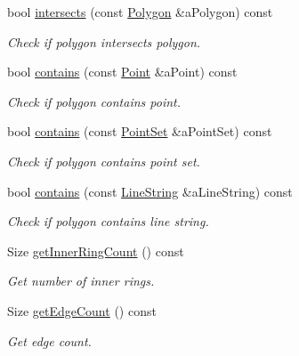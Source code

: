 \begin{DoxyCompactItemize}
bool \hyperlink{classostk_1_1math_1_1geom_1_1d2_1_1objects_1_1_polygon_ad0183cbb840fe9f1fb9dfde0cc3eae50}{intersects} (const \hyperlink{classostk_1_1math_1_1geom_1_1d2_1_1objects_1_1_polygon}{Polygon} \&a\+Polygon) const
\begin{DoxyCompactList}\small\item\em Check if polygon intersects polygon. \end{DoxyCompactList}\item 
bool \hyperlink{classostk_1_1math_1_1geom_1_1d2_1_1objects_1_1_polygon_aa9f49a046d832821a8b26064b3cf2158}{contains} (const \hyperlink{classostk_1_1math_1_1geom_1_1d2_1_1objects_1_1_point}{Point} \&a\+Point) const
\begin{DoxyCompactList}\small\item\em Check if polygon contains point. \end{DoxyCompactList}\item 
bool \hyperlink{classostk_1_1math_1_1geom_1_1d2_1_1objects_1_1_polygon_a6a95f14d1bcbc3d0231ed09f31d17045}{contains} (const \hyperlink{classostk_1_1math_1_1geom_1_1d2_1_1objects_1_1_point_set}{Point\+Set} \&a\+Point\+Set) const
\begin{DoxyCompactList}\small\item\em Check if polygon contains point set. \end{DoxyCompactList}\item 
bool \hyperlink{classostk_1_1math_1_1geom_1_1d2_1_1objects_1_1_polygon_a203d0490d40b2a221f46194765e0435d}{contains} (const \hyperlink{classostk_1_1math_1_1geom_1_1d2_1_1objects_1_1_line_string}{Line\+String} \&a\+Line\+String) const
\begin{DoxyCompactList}\small\item\em Check if polygon contains line string. \end{DoxyCompactList}\item 
Size \hyperlink{classostk_1_1math_1_1geom_1_1d2_1_1objects_1_1_polygon_a47930b6706bc8b54754e064f0d0ec29b}{get\+Inner\+Ring\+Count} () const
\begin{DoxyCompactList}\small\item\em Get number of inner rings. \end{DoxyCompactList}\item 
Size \hyperlink{classostk_1_1math_1_1geom_1_1d2_1_1objects_1_1_polygon_a585310d630d1e80f496a9525a308bb2b}{get\+Edge\+Count} () const
\begin{DoxyCompactList}\small\item\em Get edge count. \end{DoxyCompactList}\item 

\end{DoxyCompactItemize}
